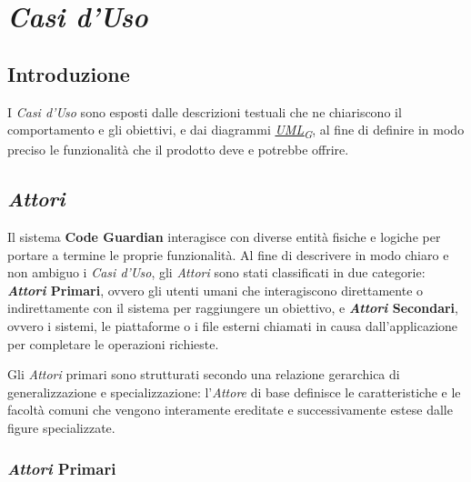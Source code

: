 \documentclass[12pt, a4paper]{article}
\newcommand{\urlglossario}{https://skynetunigroup.github.io/Code_Guardian/Documentazione/PB/glossario_v2.0.0.pdf} %
\newcommand{\glo}[2]{\href{\urlglossario\#nameddest=#2}{#1\textsubscript{G}}}
\begin{document}
\newpage
\section{\textit{Casi d'Uso}}

\subsection{Introduzione}
I \textit{Casi d'Uso} sono esposti dalle descrizioni testuali che ne chiariscono il comportamento e gli obiettivi, e dai diagrammi \textit{\glo{UML}{uml}}, al fine di definire in modo preciso le funzionalità che il prodotto deve e potrebbe offrire.

\subsection{\textit{Attori}}

Il sistema \textbf{Code Guardian} interagisce con diverse entità fisiche e logiche per portare a termine le proprie funzionalità. Al fine di descrivere in modo chiaro e non ambiguo i \textit{Casi d'Uso}, gli \textit{Attori} sono stati classificati in due categorie: \textbf{\textit{Attori} Primari}, ovvero gli utenti umani che interagiscono direttamente o indirettamente con il sistema per raggiungere un obiettivo, e \textbf{\textit{Attori} Secondari}, ovvero i sistemi, le piattaforme o i file esterni chiamati in causa dall'applicazione per completare le operazioni richieste.

Gli \textit{Attori} primari sono strutturati secondo una relazione gerarchica di generalizzazione e specializzazione: l'\textit{Attore} di base definisce le caratteristiche e le facoltà comuni che vengono interamente ereditate e successivamente estese dalle figure specializzate.

\subsubsection{\textit{Attori} Primari}
\end{document}
